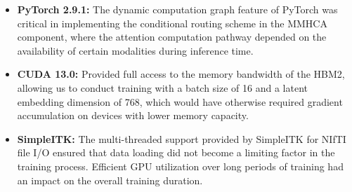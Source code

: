 \begin{itemize}
   \item \textbf{PyTorch 2.9.1:} The dynamic computation graph feature of PyTorch was critical in implementing the conditional routing scheme in the MMHCA component, where the attention computation pathway depended on the availability of certain modalities during inference time.
    \item \textbf{CUDA 13.0:} Provided full access to the memory bandwidth of the HBM2, allowing us to conduct training with a batch size of 16 and a latent embedding dimension of 768, which would have otherwise required gradient accumulation on devices with lower memory capacity.
    \item \textbf{SimpleITK:} The multi-threaded support provided by SimpleITK for NIfTI file I/O ensured that data loading did not become a limiting factor in the training process. Efficient GPU utilization over long periods of training had an impact on the overall training duration.
\end{itemize}